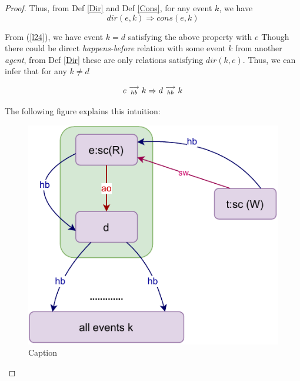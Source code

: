 \begin{proof}
    Thus, from Def \ref{Dir} and Def \ref{Cons}, for any event $k$, we have 
    \[
        dir(e,k) \Rightarrow cons(e,k)
    \]
    
    From (\ref{l24}), we have event $k=d$ satisfying the above property with $e$  
    Though there could be direct \textit{happens-before} relation with some event $k$ from another \textit{agent}, from Def \ref{Dir} these are only relations satisfying $dir(k,e)$. Thus, we can infer that for any $k \neq d$ 
    
    \[
        e\stackrel{\longrightarrow}{_{hb}}k \Rightarrow d\stackrel{\longrightarrow}{_{hb}}k
    \]
    
    The following figure explains this intuition: 
    
    \begin{figure}[H]
        \centering
        \includegraphics[scale=0.7]{InstructionReordering/Lemmas/lemma_proof2_case2.pdf}
        \caption{Caption}
        \label{fig:my_label}
    \end{figure}

\end{proof}


